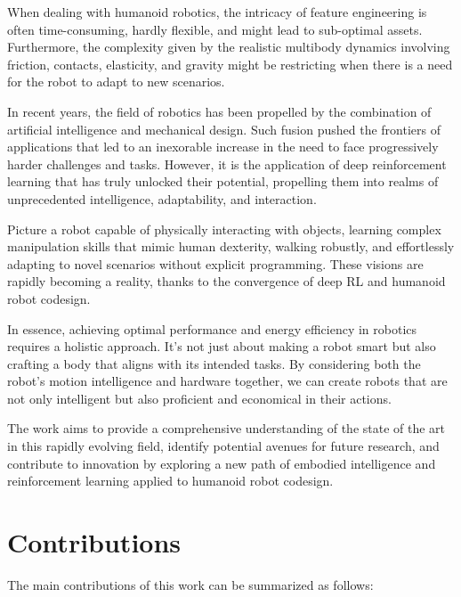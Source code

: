 When dealing with humanoid robotics, the intricacy of feature engineering is often time-consuming, hardly flexible, and might lead to sub-optimal assets. Furthermore, the complexity given by the realistic multibody dynamics involving friction, contacts, elasticity, and gravity might be restricting when there is a need for the robot to adapt to new scenarios.

In recent years, the field of robotics has been propelled by the combination of artificial intelligence and mechanical design. Such fusion pushed the frontiers of applications that led to an inexorable increase in the need to face progressively harder challenges and tasks. However, it is the application of deep reinforcement learning that has truly unlocked their potential, propelling them into realms of unprecedented intelligence, adaptability, and interaction.

Picture a robot capable of physically interacting with objects, learning complex manipulation skills that mimic human dexterity, walking robustly, and effortlessly adapting to novel scenarios without explicit programming. These visions are rapidly becoming a reality, thanks to the convergence of deep \ac{RL} and humanoid robot codesign.

In essence, achieving optimal performance and energy efficiency in robotics requires a holistic approach. It's not just about making a robot smart but also crafting a body that aligns with its intended tasks. By considering both the robot's motion intelligence and hardware together, we can create robots that are not only intelligent but also proficient and economical in their actions.

The work aims to provide a comprehensive understanding of the state of the art in this rapidly evolving field, identify potential avenues for future research, and contribute to innovation by exploring a new path of embodied intelligence and reinforcement learning applied to humanoid robot codesign.

\section*{Contributions}

The main contributions of this work can be summarized as follows:

